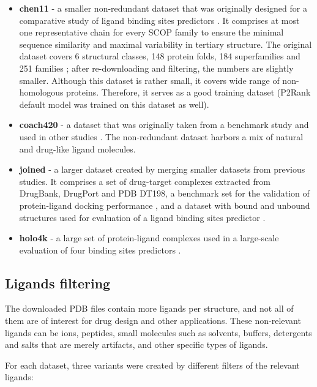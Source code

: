 \begin{itemize}
  \item \textbf{chen11}
  - a smaller non-redundant dataset that was originally designed for a comparative study of ligand binding sites predictors \cite{benchmark}. It comprises at most one representative chain for every SCOP family \cite{scop} to ensure the minimal sequence similarity and maximal variability in tertiary structure. The original dataset covers 6 structural classes, 148 protein folds, 184 superfamilies and 251 families \cite{benchmark}; after re-downloading and filtering, the numbers are slightly smaller. Although this dataset is rather small, it covers wide range of non-homologous proteins. Therefore, it serves as a good training dataset (P2Rank default model was trained on this dataset as well).
  
  \item \textbf{coach420}
  - a dataset that was originally taken from a benchmark study \cite{cofactor} and used in other studies \cite{coach, p2rank1}. The non-redundant dataset harbors a mix of natural and drug-like ligand molecules.
  
  \item \textbf{joined}
  - a larger dataset created by merging smaller datasets from previous studies. It comprises a set of drug-target complexes extracted from DrugBank, DrugPort and PDB DT198\cite{dt}, a benchmark set for the validation of protein-ligand docking performance \cite{astex}, and a dataset with bound and unbound structures used for evaluation of a ligand binding sites predictor \cite{ligsite}.
  
  \item \textbf{holo4k}
  - a large set of protein-ligand complexes used in a large-scale evaluation of four binding sites predictors \cite{holo4k}.
\end{itemize}


\subsection{Ligands filtering}

The downloaded PDB files contain more ligands per structure, and not all of them are of interest for drug design and other applications. These non-relevant ligands can be ions, peptides, small molecules such as solvents, buffers, detergents and salts that are merely artifacts, and other specific types of ligands.

For each dataset, three variants were created by different filters of the relevant ligands:

